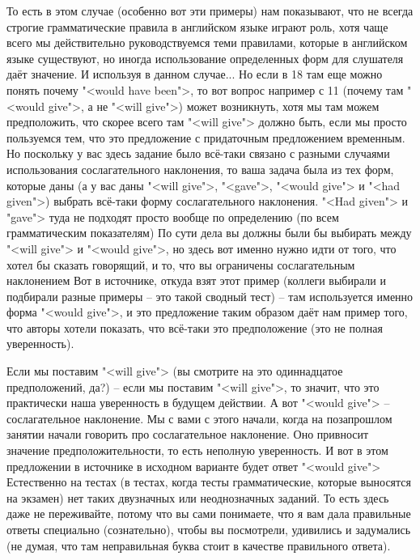 \documentclass[main.tex]{subfiles}
\begin{document}
То есть в этом случае (особенно вот эти примеры) нам показывают, что не всегда строгие грамматические правила в английском языке играют роль, хотя чаще всего мы действительно руководствуемся теми правилами, которые в английском языке существуют, но иногда использование определенных форм для слушателя даёт значение.
И используя в данном случае...
Но если в 18 там еще можно понять почему "<would have been">, то вот вопрос например с 11 (почему там "<would give">, а не "<will give">) может возникнуть, хотя мы там можем предположить, что скорее всего там "<will give"> должно быть, если мы просто пользуемся тем, что это предложение с придаточным предложением временным.
Но поскольку у вас здесь задание было всё-таки связано с разными случаями использования сослагательного наклонения, то ваша задача была из тех форм, которые даны (а у вас даны "<will give">, "<gave">, "<would give"> и "<had given">) выбрать всё-таки форму сослагательного наклонения.
"<Had given"> и "gave"> туда не подходят просто вообще по определению (по всем грамматическим показателям)
По сути дела вы должны были бы выбирать между "<will give"> и "<would give">, но здесь вот именно нужно идти от того, что хотел бы сказать говорящий, и то, что вы ограничены сослагательным наклонением
Вот в источнике, откуда взят этот пример (коллеги выбирали и подбирали разные примеры -- это такой сводный тест) -- там используется именно форма "<would give">, и это предложение таким образом даёт нам пример того, что авторы хотели показать, что всё-таки это предположение (это не полная уверенность).

Если мы поставим "<will give"> (вы смотрите на это одиннадцатое предположений, да?) -- если мы поставим "<will give">, то значит, что это практически наша уверенность в будущем действии.
А вот "<would give"> -- сослагательное наклонение.
Мы с вами с этого начали, когда на позапрошлом занятии начали говорить про сослагательное наклонение.
Оно привносит значение предположительности, то есть неполную уверенность.
И вот в этом предложении в источнике в исходном варианте будет ответ "<would give">
Естественно на тестах (в тестах, когда тесты грамматические, которые выносятся на экзамен) нет таких двузначных или неоднозначных заданий.
То есть здесь даже не переживайте, потому что вы сами понимаете, что я вам дала правильные ответы специально (сознательно), чтобы вы посмотрели, удивились и задумались (не думая, что там неправильная буква стоит в качестве правильного ответа).
\end{document}
